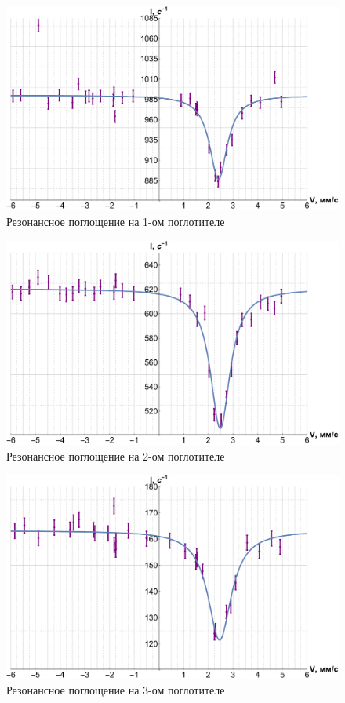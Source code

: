 \documentclass[12pt]{kiarticle}
\begin{document}
     \begin{figure}[H]
   	\label{graf_1}
   	\includegraphics[scale=0.47]{gr1.pdf}
   	\caption{Резонансное поглощение на 1-ом поглотителе}
   \end{figure}
   
   \begin{figure}[H]
   	\label{graf_2}
   	\includegraphics[scale=0.47]{gr2.pdf}
   	\caption{Резонансное поглощение на 2-ом поглотителе}
   \end{figure}
   
   \begin{figure}[H]
   	\label{graf_3}
   	\includegraphics[scale=0.47]{gr3.pdf}
   	\caption{Резонансное поглощение на 3-ом поглотителе}
   \end{figure}
   
\end{document}
